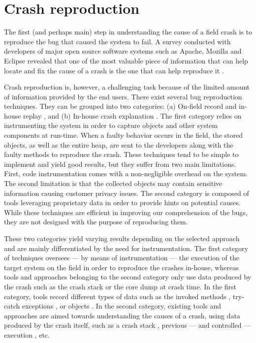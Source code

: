 \section{Crash reproduction\label{sec:rel-reproduction}}

The first (and perhaps main) step in understanding the cause of a field crash is to reproduce the bug that caused the system to fail.
A survey conducted with developers of major open source software systems such as Apache, Mozilla and Eclipse revealed that one of the most valuable piece of information that can help locate and fix the cause of a crash is the one that can help reproduce it \cite{Bettenburg2008}.

Crash reproduction is, however, a challenging task because of the limited amount of information  provided by the end users.
There exist several bug reproduction techniques. They can be grouped into two categories: (a) On-field record and in-house replay \cite{Narayanasamy2005,Artzi2008,Jaygarl}, and (b) In-house crash explanation \cite{Manevich2004,chandra2009snugglebug}.
The first category relies on instrumenting the system in order to capture objects and other system components at run-time.
When a faulty behavior occurs in the field, the stored objects, as well as the entire heap, are sent to the developers along with the faulty methods to reproduce the crash.
These techniques tend to be simple to implement and yield good results, but they suffer from two main limitations.
First, code instrumentation comes with a non-negligible overhead on the system.
The second limitation is that the collected objects may contain sensitive information causing customer privacy issues.
The second category is composed of tools leveraging proprietary data in order to provide hints on potential causes. While these techniques are efficient in improving our comprehension of the bugs, they are not designed with the purpose of reproducing them.

These two categories yield varying results depending on the selected approach and are mainly differentiated by the need for instrumentation.
The first category of techniques oversees --- by means of instrumentation --- the execution of the target system on the field in order to reproduce the crashes in-house, whereas tools and approaches belonging to the second category only use data produced by the crash such as the crash stack or the core dump at crash time.
In the first category, tools record different types of data such as the invoked methods \cite{Narayanasamy2005}, try-catch exceptions \cite{Rossler2013}, or objects \cite{Jaygarl}.
In the second category, existing tools and approaches are aimed towards understanding the causes of a crash, using data produced by the crash itself, such as a crash stack \cite{Chen2013a}, previous --- and controlled --- execution \cite{Zuddas2014}, etc.

